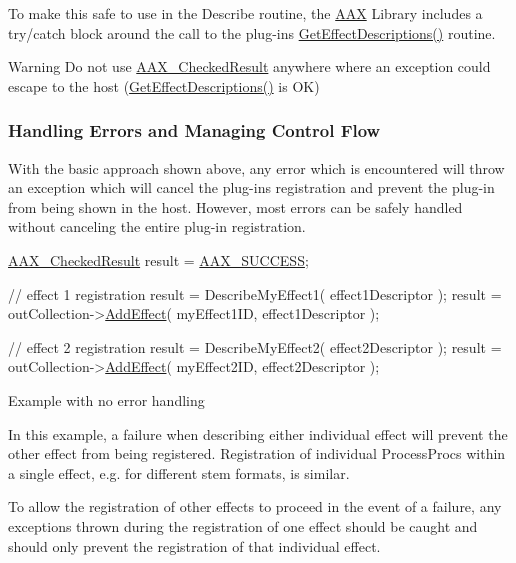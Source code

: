  To make this safe to use in the Describe routine, the \hyperlink{a00288}{A\+A\+X} Library includes a try/catch block around the call to the plug-\/in\textquotesingle{}s {\ttfamily \hyperlink{a00326_gae0d356eef326f77cbb972e48946d4892}{Get\+Effect\+Descriptions()}} routine.

 \begin{DoxyWarning}{Warning}
Do not use \hyperlink{a00019}{A\+A\+X\+\_\+\+Checked\+Result} anywhere where an exception could escape to the host (\hyperlink{a00326_gae0d356eef326f77cbb972e48946d4892}{Get\+Effect\+Descriptions()} is O\+K)
\end{DoxyWarning}
\hypertarget{a00326_describe_checking_results_handling_errors}{}\subsubsection{Handling Errors and Managing Control Flow}\label{a00326_describe_checking_results_handling_errors}
 With the basic approach shown above, any error which is encountered will throw an exception which will cancel the plug-\/in\textquotesingle{}s registration and prevent the plug-\/in from being shown in the host. However, most errors can be safely handled without canceling the entire plug-\/in registration.


\begin{DoxyCode}
\hyperlink{a00019}{AAX\_CheckedResult} result = \hyperlink{a00207_a5f8c7439f3a706c4f8315a9609811937aeddbd1bb67e3a66e6af54a4b4a7a57b3}{AAX\_SUCCESS};

\textcolor{comment}{// effect 1 registration}
result = DescribeMyEffect1( effect1Descriptor );
result = outCollection->\hyperlink{a00087_a5ff114b8c4da2081515186f2faf65c8c}{AddEffect}( myEffect1ID, effect1Descriptor );

\textcolor{comment}{// effect 2 registration}
result = DescribeMyEffect2( effect2Descriptor );
result = outCollection->\hyperlink{a00087_a5ff114b8c4da2081515186f2faf65c8c}{AddEffect}( myEffect2ID, effect2Descriptor );
\end{DoxyCode}
 Example with no error handling

 In this example, a failure when describing either individual effect will prevent the other effect from being registered. Registration of individual Process\+Procs within a single effect, e.\+g. for different stem formats, is similar.

 To allow the registration of other effects to proceed in the event of a failure, any exceptions thrown during the registration of one effect should be caught and should only prevent the registration of that individual effect.


